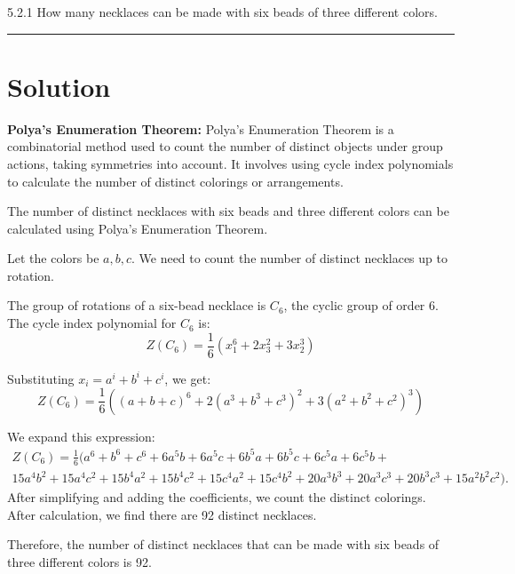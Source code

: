\documentclass[12pt]{amsart}
\theoremstyle{definition}
\numberwithin{equation}{section}
\begin{document}
\begin{exercise}{5.2.1} How many necklaces can be made with six beads of three different colors.

    \noindent\rule{\linewidth}{1pt}

    \section*{Solution}
    
    \noindent \textbf{Polya's Enumeration Theorem:} Polya's Enumeration Theorem is a combinatorial method used to count the number of distinct objects under group actions, taking symmetries into account. It involves using cycle index polynomials to calculate the number of distinct colorings or arrangements.
    
    The number of distinct necklaces with six beads and three different colors can be calculated using Polya's Enumeration Theorem.

    Let the colors be \(a, b, c\). We need to count the number of distinct necklaces up to rotation.

    The group of rotations of a six-bead necklace is \(C_6\), the cyclic group of order 6. The cycle index polynomial for \(C_6\) is:
    \[
    Z(C_6) = \frac{1}{6} (x_1^6 + 2x_3^2 + 3x_2^3)
    \]

    Substituting \(x_i = a^i + b^i + c^i\), we get:
    \[
    Z(C_6) = \frac{1}{6} ((a+b+c)^6 + 2(a^3 + b^3 + c^3)^2 + 3(a^2 + b^2 + c^2)^3)
    \]

    We expand this expression:
    \begin{multline*}
        Z(C_6) = \frac{1}{6} (a^6 + b^6 + c^6 + 6a^5b + 6a^5c + 6b^5a + 6b^5c + 6c^5a + 6c^5b + \\ 15a^4b^2 + 15a^4c^2 + 15b^4a^2 + 15b^4c^2 + 15c^4a^2 + 15c^4b^2 + 20a^3b^3 + 20a^3c^3 + 20b^3c^3 + 15a^2b^2c^2).
    \end{multline*}
    After simplifying and adding the coefficients, we count the distinct colorings. After calculation, we find there are 92 distinct necklaces.

    Therefore, the number of distinct necklaces that can be made with six beads of three different colors is 92.

\end{exercise}
\newpage
\end{document}
